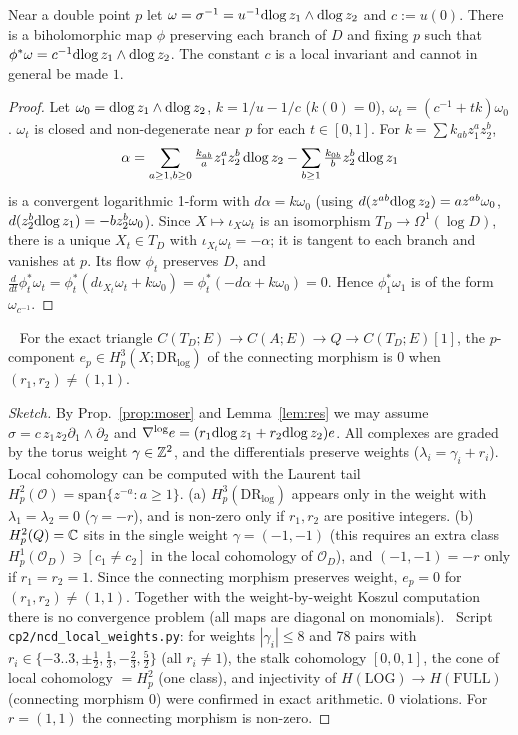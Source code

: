 \begin{prop}\tP\label{prop:moser}
Near a double point $p$ let $\omega=\sigma^{-1}=u^{-1}\mathrm{dlog}\, z_1\wedge\mathrm{dlog}\, z_2$ and $c:=u(0)$. There is a biholomorphic map $\phi$ preserving each branch of $D$ and fixing $p$ such that $\phi^*\omega=c^{-1}\mathrm{dlog}\, z_1\wedge\mathrm{dlog}\, z_2$. The constant $c$ is a local invariant and cannot in general be made $1$.
\end{prop}
\begin{proof}
Let $\omega_0=\mathrm{dlog}\, z_1\wedge\mathrm{dlog}\, z_2$, $k=1/u-1/c$ ($k(0)=0$), $\omega_t=(c^{-1}+tk)\omega_0$. $\omega_t$ is closed and non-degenerate near $p$ for each $t\in[0,1]$. For $k=\sum k_{ab}z_1^az_2^b$,
\[\alpha=\sum_{a\ge1,b\ge0}\tfrac{k_{ab}}{a}z_1^az_2^b\,\mathrm{dlog}\, z_2-\sum_{b\ge1}\tfrac{k_{0b}}{b}z_2^b\,\mathrm{dlog}\, z_1\]
is a convergent logarithmic 1-form with $d\alpha=k\omega_0$ (using $d(z^{ab}\mathrm{dlog}\, z_2)=az^{ab}\omega_0$, $d(z_2^b\mathrm{dlog}\, z_1)=-bz_2^b\omega_0$). Since $X\mapsto\iota_X\omega_t$ is an isomorphism $T_D\to\Omega^1(\log D)$, there is a unique $X_t\in T_D$ with $\iota_{X_t}\omega_t=-\alpha$; it is tangent to each branch and vanishes at $p$. Its flow $\phi_t$ preserves $D$, and $\tfrac{d}{dt}\phi_t^*\omega_t=\phi_t^*(d\iota_{X_t}\omega_t+k\omega_0)=\phi_t^*(-d\alpha+k\omega_0)=0$. Hence $\phi_1^*\omega_1$ is of the form $\omega_{c^{-1}}$.\qedhere
\end{proof}
\begin{lem}\tP\ \tV\label{lem:conn}
For the exact triangle $C(T_D;E)\to C(A;E)\to Q\to C(T_D;E)[1]$, the $p$-component $e_p\in H^3_p(X;\mathrm{DR}_{\log})$ of the connecting morphism is $0$ when $(r_1,r_2)\ne(1,1)$.
\end{lem}
\begin{proof}[Sketch]
By Prop.~\ref{prop:moser} and Lemma~\ref{lem:res} we may assume $\sigma=c\,z_1z_2\partial_1\wedge\partial_2$ and $\nabla^{\log}e=(r_1\mathrm{dlog}\, z_1+r_2\mathrm{dlog}\, z_2)e$. All complexes are graded by the torus weight $\gamma\in\mathbb Z^2$, and the differentials preserve weights ($\lambda_i=\gamma_i+r_i$). Local cohomology can be computed with the Laurent tail $H^2_p(\mathcal O)=\mathrm{span}\{z^{-a}:a\ge1\}$. (a) $H^3_p(\mathrm{DR}_{\log})$ appears only in the weight with $\lambda_1=\lambda_2=0$ ($\gamma=-r$), and is non-zero only if $r_1,r_2$ are positive integers. (b) $H^2_p(Q)=\mathbb C$ sits in the single weight $\gamma=(-1,-1)$ (this requires an extra class $H^1_p(\mathcal O_D)\ni[c_1\ne c_2]$ in the local cohomology of $\mathcal O_D$), and $(-1,-1)=-r$ only if $r_1=r_2=1$. Since the connecting morphism preserves weight, $e_p=0$ for $(r_1,r_2)\ne(1,1)$. Together with the weight-by-weight Koszul computation there is no convergence problem (all maps are diagonal on monomials).
\tV\ Script \texttt{cp2/ncd\_local\_weights.py}: for weights $|\gamma_i|\le8$ and 78 pairs with $r_i\in\{-3..3,\pm\frac12,\frac13,-\frac23,\frac52\}$ (all $r_i\ne1$), the stalk cohomology $[0,0,1]$, the cone of local cohomology $=H^2_p$ (one class), and injectivity of $H(\mathrm{LOG})\to H(\mathrm{FULL})$ (connecting morphism $0$) were confirmed in exact arithmetic. 0 violations. For $r=(1,1)$ the connecting morphism is non-zero.
\end{proof}
